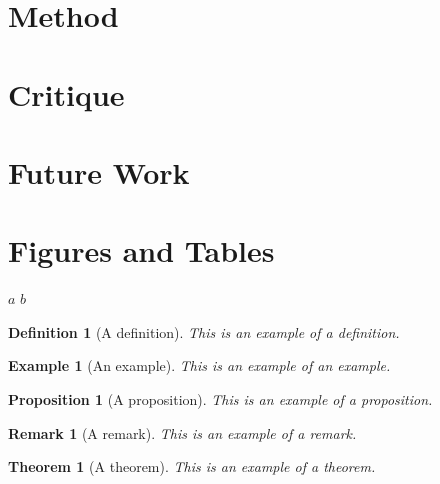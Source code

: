 \documentclass[12pt,onecolumn,letterpaper]{IEEEtran}  %
\newtheorem{definition}{Definition}
\newtheorem{example}{Example}
\newtheorem{proposition}{Proposition}
\newtheorem{remark}{Remark}
\newtheorem{theorem}{Theorem}
\begin{document}
\section{Method}
\lipsum[3-5]


\section{Critique}
\lipsum[6-8]


\section{Future Work}
\lipsum[9-12]


\newpage
\appendices
\section{Figures and Tables}

\begin{algorithm}
    \caption{This is an example of an algorithm.} \label{alg1}
    \begin{algorithmic}[1]
                \State \Return $a$
            \Else
                \State \Return $b$
            \EndIf
        \EndProcedure
    \end{algorithmic}
\end{algorithm}

\begin{definition}[A definition] \label{def1}
    This is an example of a definition.
\end{definition}

\begin{example}[An example] \label{eg1}
    This is an example of an example.
\end{example}

\begin{proposition}[A proposition] \label{prop1}
    This is an example of a proposition.
\end{proposition}

\begin{remark}[A remark] \label{rem1}
    This is an example of a remark.
\end{remark}

\begin{theorem}[A theorem] \label{thm1}
    This is an example of a theorem.
\end{theorem}
\end{document}
